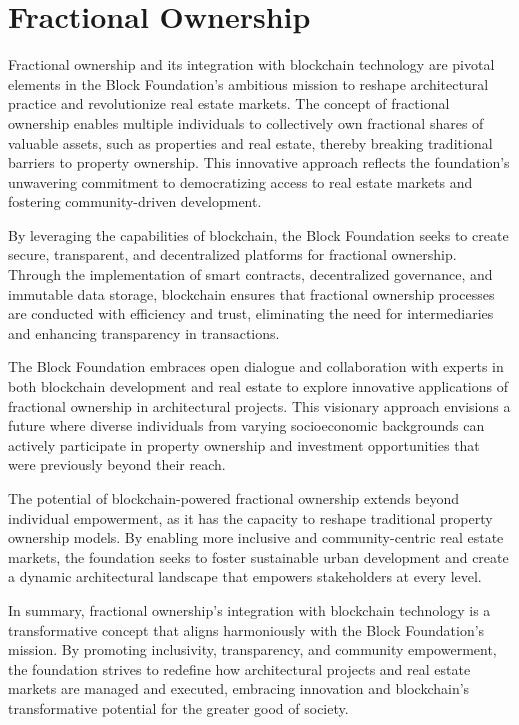 \newpage
\section{Fractional Ownership}

Fractional ownership and its integration with blockchain technology are pivotal elements in the Block Foundation's ambitious mission to reshape architectural practice and revolutionize real estate markets. The concept of fractional ownership enables multiple individuals to collectively own fractional shares of valuable assets, such as properties and real estate, thereby breaking traditional barriers to property ownership. This innovative approach reflects the foundation's unwavering commitment to democratizing access to real estate markets and fostering community-driven development.

By leveraging the capabilities of blockchain, the Block Foundation seeks to create secure, transparent, and decentralized platforms for fractional ownership. Through the implementation of smart contracts, decentralized governance, and immutable data storage, blockchain ensures that fractional ownership processes are conducted with efficiency and trust, eliminating the need for intermediaries and enhancing transparency in transactions.

The Block Foundation embraces open dialogue and collaboration with experts in both blockchain development and real estate to explore innovative applications of fractional ownership in architectural projects. This visionary approach envisions a future where diverse individuals from varying socioeconomic backgrounds can actively participate in property ownership and investment opportunities that were previously beyond their reach.

The potential of blockchain-powered fractional ownership extends beyond individual empowerment, as it has the capacity to reshape traditional property ownership models. By enabling more inclusive and community-centric real estate markets, the foundation seeks to foster sustainable urban development and create a dynamic architectural landscape that empowers stakeholders at every level.

In summary, fractional ownership's integration with blockchain technology is a transformative concept that aligns harmoniously with the Block Foundation's mission. By promoting inclusivity, transparency, and community empowerment, the foundation strives to redefine how architectural projects and real estate markets are managed and executed, embracing innovation and blockchain's transformative potential for the greater good of society.